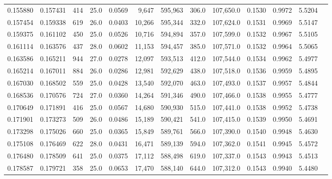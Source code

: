 \begin{tabular}{rrrrrrrrrrrrr}
0.155880 & 0.157431 &   414 & 25.0 &                                     0.0569 &   9,647 & 595,963 &     306.0 & 107,650.0 & 0.1530 & 0.9972 & 5.5204 \\
0.157454 & 0.159338 &   619 & 26.0 &                                     0.0403 &  10,266 & 595,344 &     332.0 & 107,624.0 & 0.1531 & 0.9969 & 5.5147 \\
0.159375 & 0.161102 &   450 & 25.0 &                                     0.0526 &  10,716 & 594,894 &     357.0 & 107,599.0 & 0.1532 & 0.9967 & 5.5105 \\
0.161114 & 0.163576 &   437 & 28.0 &                                     0.0602 &  11,153 & 594,457 &     385.0 & 107,571.0 & 0.1532 & 0.9964 & 5.5065 \\
0.163586 & 0.165211 &   944 & 27.0 &                                     0.0278 &  12,097 & 593,513 &     412.0 & 107,544.0 & 0.1534 & 0.9962 & 5.4977 \\
0.165214 & 0.167011 &   884 & 26.0 &                                     0.0286 &  12,981 & 592,629 &     438.0 & 107,518.0 & 0.1536 & 0.9959 & 5.4895 \\
0.167030 & 0.168502 &   559 & 25.0 &                                     0.0428 &  13,540 & 592,070 &     463.0 & 107,493.0 & 0.1537 & 0.9957 & 5.4844 \\
0.168536 & 0.170576 &   724 & 27.0 &                                     0.0360 &  14,264 & 591,346 &     490.0 & 107,466.0 & 0.1538 & 0.9955 & 5.4777 \\
0.170649 & 0.171891 &   416 & 25.0 &                                     0.0567 &  14,680 & 590,930 &     515.0 & 107,441.0 & 0.1538 & 0.9952 & 5.4738 \\
0.171901 & 0.173273 &   509 & 26.0 &                                     0.0486 &  15,189 & 590,421 &     541.0 & 107,415.0 & 0.1539 & 0.9950 & 5.4691 \\
0.173298 & 0.175026 &   660 & 25.0 &                                     0.0365 &  15,849 & 589,761 &     566.0 & 107,390.0 & 0.1540 & 0.9948 & 5.4630 \\
0.175108 & 0.176469 &   622 & 28.0 &                                     0.0431 &  16,471 & 589,139 &     594.0 & 107,362.0 & 0.1541 & 0.9945 & 5.4572 \\
0.176480 & 0.178509 &   641 & 25.0 &                                     0.0375 &  17,112 & 588,498 &     619.0 & 107,337.0 & 0.1543 & 0.9943 & 5.4513 \\
0.178587 & 0.179721 &   358 & 25.0 &                                     0.0653 &  17,470 & 588,140 &     644.0 & 107,312.0 & 0.1543 & 0.9940 & 5.4480 \\

\end{tabular}
